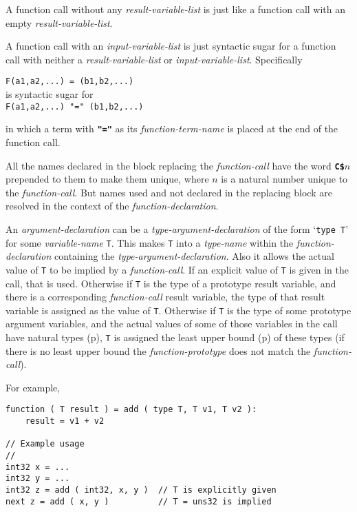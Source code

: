 \documentclass[12pt]{article}
\newcommand{\TT}[1]{{\tt \bfseries #1}}
\newcommand{\pagref}[1]{p\pageref{#1}}
\newenvironment{indpar}[1][0.3in]%
	{\begin{list}{}%
		     {\setlength{\itemsep}{0in}%
		      \setlength{\topsep}{0in}%
		      \setlength{\parsep}{1ex}%
		      \setlength{\labelwidth}{#1}%
		      \setlength{\leftmargin}{#1}%
		      \addtolength{\leftmargin}{\labelsep}}%
	 \item}%
	{\end{list}}
\begin{document}
A function call without any {\em result-variable-list}
is just like a function call with an empty
{\em result-variable-list}.

A function call with an {\em input-variable-list} is just syntactic
sugar for a function call with neither a {\em result-variable-list}
or {\em input-variable-list}.  Specifically
\begin{center}
{\tt F(a1,a2,...)~=~(b1,b2,...)} \\
is syntactic sugar for \\
{\tt F(a1,a2,...)~"="~(b1,b2,...)} \\
\end{center}

in which a term with \TT{"="} as its {\em function-term-name} is
placed at the end of the function call.

All the names declared in the block replacing the {\em function-call}
have the word \TT{C\$$n$} prepended to them to make them unique,
where $n$ is a natural number unique to the {\em function-call}.
But names used and not declared in the replacing block are
resolved in the context of the {\em function-declaration}.

An {\em argument-declaration} can be a {\em type-argument-declaration}
of the form `{\tt type T}' for some {\em variable-name} {\tt T}.
This makes {\tt T} into a {\em type-name} within the {\em function-declaration}
containing the {\em type-argument-declaration}.  Also it allows the
actual value of {\tt T} to be implied by a {\em function-call}.
If an explicit value of {\tt T} is given in the call, that is used.
Otherwise if {\tt T} is the type of a prototype result variable, and there
is a corresponding {\em function-call} result variable, the type of
that result variable is assigned as the value of {\tt T}.  Otherwise
if {\tt T} is the type of some prototype argument variables, and
the actual values of some of those variables in the call have
natural types (\pagref{NATURAL-TYPE}), {\tt T} is assigned the least
upper bound (\pagref{LEAST-UPPER-BOUND}) of these types (if there
is no least upper bound the {\em function-prototype} does not
match the {\em function-call}).


For example,
\begin{indpar}\begin{verbatim}
function ( T result ) = add ( type T, T v1, T v2 ):
    result = v1 + v2

// Example usage
//
int32 x = ...
int32 y = ...
int32 z = add ( int32, x, y )  // T is explicitly given
next z = add ( x, y )          // T = uns32 is implied
\end{verbatim}\end{indpar}
\end{document}
